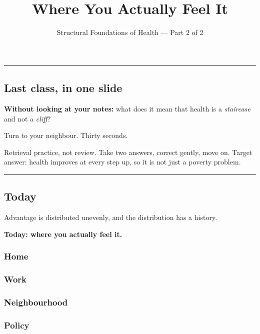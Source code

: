 \documentclass[
  letterpaper,
  DIV=11,
  numbers=noendperiod]{scrartcl}
\title{Where You Actually Feel It}
\subtitle{Structural Foundations of Health --- Part 2 of 2}
\author{}
\date{}
\begin{document}
\maketitle


\begin{center}\rule{0.5\linewidth}{0.5pt}\end{center}

\subsection{\texorpdfstring{{\textbf{Last class, in one
slide}}}{Last class, in one slide}}\label{last-class-in-one-slide}

\textbf{Without looking at your notes:} what does it mean that health is
a \emph{staircase} and not a \emph{cliff}?

Turn to your neighbour. Thirty seconds.

Retrieval practice, not review. Take two answers, correct gently, move
on. Target answer: health improves at every step up, so it is not just a
poverty problem.

\begin{center}\rule{0.5\linewidth}{0.5pt}\end{center}

\subsection{\texorpdfstring{{\textbf{Today}}}{Today}}\label{today}

Advantage is distributed unevenly, and the distribution has a history.

\textbf{Today: where you actually feel it.}

\subsubsection{Home}\label{home}

\subsubsection{Work}\label{work}

\subsubsection{Neighbourhood}\label{neighbourhood}

\subsubsection{Policy}\label{policy}
\end{document}
